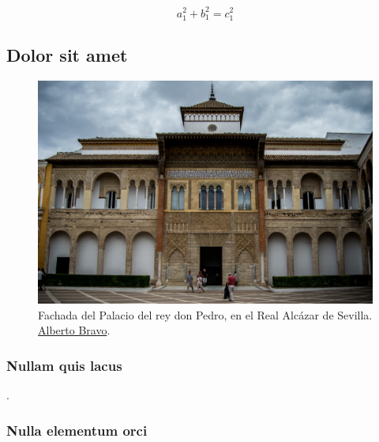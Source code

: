 \begin{equation}
        a_1^2 + b_1^2 = c_1^2
\end{equation}

\subsection{Dolor sit amet}

\lipsum[14-16]

\begin{figure}
    \centering
    \includegraphics[width=\linewidth]{figures/examples/example3.jpg}
    \caption[Fachada del Palacio del rey don Pedro, en el Real Alcázar de Sevilla.]{Fachada del Palacio del rey don Pedro, en el Real Alcázar de Sevilla. \href{https://commons.wikimedia.org/wiki/File:Fachada_del_Palacio_del_rey_don_Pedro.jpg}{Alberto Bravo}.}
    \label{fig:cha1:donpedro}
\end{figure}

\lipsum[17]

\subsubsection{Nullam quis lacus}

\lipsum[18-20] \cite{lora-hw-e539v03a}. 

\subsubsection{Nulla elementum orci}

\lipsum[21]

